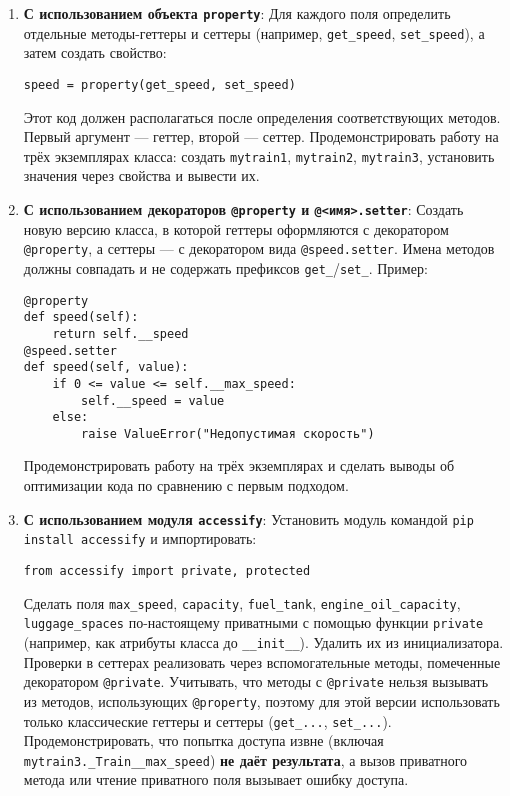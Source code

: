 \begin{enumerate}
\begin{enumerate}
    \item \textbf{С использованием объекта \texttt{property}}:  
    Для каждого поля определить отдельные методы-геттеры и сеттеры (например, \texttt{get\_speed}, \texttt{set\_speed}), а затем создать свойство:  
    \begin{verbatim}
speed = property(get_speed, set_speed)
    \end{verbatim}  
    Этот код должен располагаться после определения соответствующих методов. Первый аргумент — геттер, второй — сеттер.  
    Продемонстрировать работу на трёх экземплярах класса: создать \texttt{mytrain1}, \texttt{mytrain2}, \texttt{mytrain3}, установить значения через свойства и вывести их.
    \item \textbf{С использованием декораторов \texttt{@property} и \texttt{@<имя>.setter}}:  
    Создать новую версию класса, в которой геттеры оформляются с декоратором \texttt{@property}, а сеттеры — с декоратором вида \texttt{@speed.setter}. Имена методов должны совпадать и не содержать префиксов \texttt{get\_}/\texttt{set\_}.  
    Пример:  
    \begin{verbatim}
@property
def speed(self):
    return self.__speed
@speed.setter
def speed(self, value):
    if 0 <= value <= self.__max_speed:
        self.__speed = value
    else:
        raise ValueError("Недопустимая скорость")
    \end{verbatim}  
    Продемонстрировать работу на трёх экземплярах и сделать выводы об оптимизации кода по сравнению с первым подходом.
    \item \textbf{С использованием модуля \texttt{accessify}}:  
    Установить модуль командой \texttt{pip install accessify} и импортировать:  
    \begin{verbatim}
from accessify import private, protected
    \end{verbatim}  
    Сделать поля \texttt{max\_speed}, \texttt{capacity}, \texttt{fuel\_tank}, \texttt{engine\_oil\_capacity}, \texttt{luggage\_spaces} по-настоящему приватными с помощью функции \texttt{private} (например, как атрибуты класса до \texttt{\_\_init\_\_}). Удалить их из инициализатора.  
    Проверки в сеттерах реализовать через вспомогательные методы, помеченные декоратором \texttt{@private}.  
    Учитывать, что методы с \texttt{@private} нельзя вызывать из методов, использующих \texttt{@property}, поэтому для этой версии использовать только классические геттеры и сеттеры (\texttt{get\_...}, \texttt{set\_...}).  
    Продемонстрировать, что попытка доступа извне (включая \texttt{mytrain3.\_Train\_\_max\_speed}) \textbf{не даёт результата}, а вызов приватного метода или чтение приватного поля вызывает ошибку доступа.

\end{enumerate}
\end{enumerate}
